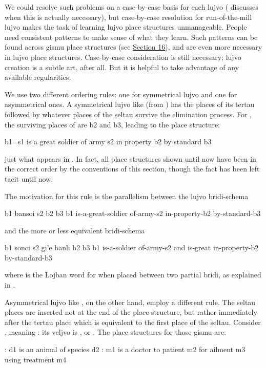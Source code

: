 We could resolve such problems on a case-by-case basis for
    each lujvo ( discusses when this
    is actually necessary), but case-by-case resolution for
    run-of-the-mill lujvo makes the task of learning lujvo place
    structures unmanageable. People need consistent patterns to
    make sense of what they learn. Such patterns can be found
    across gismu place structures (see \hyperref[sec:12:16]{Section
    16}), and are even more necessary in lujvo place structures.
    Case-by-case consideration is still necessary; lujvo creation
    is a subtle art, after all. But it is helpful to take advantage
    of any available regularities.

We use two different ordering rules: one for symmetrical
    lujvo and one for asymmetrical ones. A symmetrical lujvo like
     (from ) has the places of
    its tertau followed by whatever places of the seltau survive
    the elimination process. For , the surviving places
    of  are b2 and b3, leading to the place structure:
\begin{example}
b1=s1 is a great soldier of army s2\n
\T	in property b2 by standard b3
\end{example}

{\noindent}just what appears in . In fact,
    all place structures shown until now have been in the correct
    order by the conventions of this section, though the fact has
    been left tacit until now. 

The motivation for this rule is the parallelism between the
    lujvo bridi-schema
\begin{example}
b1 bansoi s2 b2 b3\n
b1 is-a-great-soldier of-army-s2\n
\T	in-property-b2 by-standard-b3
\end{example}

{\noindent}and the more or less equivalent bridi-schema
\begin{example}
b1 sonci s2 gi'e banli b2 b3\n
b1 is-a-soldier of-army-s2 and\n
\T	is-great in-property-b2\n
\T	by-standard-b3
\end{example}

{\noindent}where  is the Lojban word for  when placed
    between two partial bridi, as explained in . 

Asymmetrical lujvo like , on the other hand,
    employ a different rule. The seltau places are inserted not at
    the end of the place structure, but rather immediately after
    the tertau place which is equivalent to the first place of the
    seltau. Consider , meaning : its
    veljvo is , or . The place
    structures for those gismu are:
\begin{example}
: d1 is an animal of species d2\n
{}: m1 is a doctor to patient m2 for ailment m3\n
\T	using treatment m4
\end{example}

